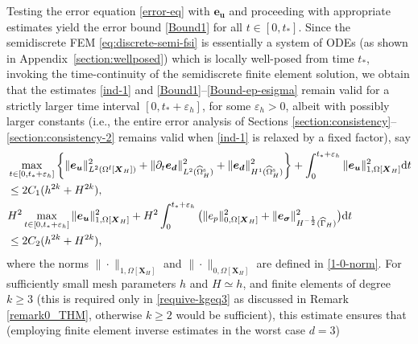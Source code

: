 \documentclass[11pt,reqno]{amsart}
\theoremstyle{definition}
\theoremstyle{plain}
\numberwithin{theorem}{section}
\numberwithin{proposition}{section}
\numberwithin{lemma}{section}
\numberwithin{equation}{section}
\newcommand{\bs}[1]{\boldsymbol{#1}}
\newcommand{\dep}{{{\bs{d}}}}
\def\d{\mathrm{d}}
\renewcommand{\(}{\bigl(}
\renewcommand{\)}{\bigr)}
\begin{document}
Testing the  error equation \eqref{error-eq} with $\boldsymbol{e}_{\bs u}$ and proceeding with appropriate  estimates yield the error bound \eqref{Bound1} for all $t\in [0,t_*]$. 
Since the semidiscrete FEM  \eqref{eq:discrete-semi-fsi} is essentially a system of ODEs (as shown in Appendix~\ref{section:wellposed}) which is locally well-posed from time $t_*$, invoking the time-continuity of the semidiscrete finite element solution, we obtain that the estimates \eqref{ind-1} and \eqref{Bound1}--\eqref{Bound-ep-esigma} remain valid for a strictly larger time interval $[0,t_*+\varepsilon_{h}]$, for some $\varepsilon_{h}>0$, albeit with possibly larger constants (i.e., the entire error analysis of
Sections \ref{section:consistency}--\ref{section:consistency-2} remains valid when \eqref{ind-1} is relaxed by a fixed factor), say
\begin{align}\label{Bound1-sec6}
& \max_{t\in[0,t_*+\varepsilon_{h}]} \left\{ \| {\bs e}_{\bs u} \|_{L^2(\Omega^{\rm f}[\bs X_H])}^2 + \|\partial_t{\bs e}_\dep\|_{L^2(\widehat{\Omega}^{\rm s}_H)}^2 
+ \|{\bs e}_\dep\|_{H^1(\widehat{\Omega}^{\rm s}_H)}^2 \right\} 
+ \int_0^{t_*+\varepsilon_{h}} \| {\bs e}_{\bs u}\|_{1, \Omega[\bs X_H]}^2 \d t \notag\\
&\le 2C_1(h^{2k}+H^{2k}) ,\\
\label{Bound2-sec6}
& H^2\max_{t\in[0,t_*+\varepsilon_{h}]}\|{\bs e}_{\bs u}\|_{1,\Omega[{\bs X}_H]}^2
+H^2\int_0^{t_*+\varepsilon_{h}} \big( \| e_p \|_{0,\Omega[{\bs X}_H]}^2 
+  \| {\bs e}_{{\bs \sigma} } \|_{H^{-\frac12}(\widehat\Gamma_H)}^2 \big) \d t \notag\\
&\le 2C_2(h^{2k}+H^{2k}) ,
\end{align}
where the norms $\| \cdot \|_{1, \Omega[\bs X_H]}$ and $\| \cdot \|_{0, \Omega[\bs X_H]}$ are defined in \eqref{1-0-norm}. 
For sufficiently small mesh parameters $h$ and $H\simeq h$, and finite elements of degree $k\geq 3$ (this is required only in \eqref{requive-kgeq3} as discussed in Remark \ref{remark0_THM}, otherwise $k\geq 2$ would be sufficient), this estimate ensures that (employing finite element inverse estimates in the worst case $d = 3$) 
\end{document}
